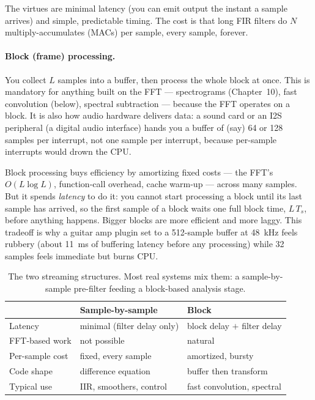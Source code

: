 The virtues are minimal latency (you can emit output the instant a sample
arrives) and simple, predictable timing. The cost is that long FIR filters do
$N$ multiply-accumulates (MACs) per sample, every sample, forever.

\paragraph{Block (frame) processing.} You collect $L$ samples into a buffer,
then process the whole block at once. This is mandatory for anything built on
the FFT --- spectrograms (Chapter~10), fast convolution (below), spectral
subtraction --- because the FFT operates on a block. It is also how audio
hardware delivers data: a sound card or an I2S peripheral (a digital audio interface) hands you a
buffer of (say) 64 or 128 samples per interrupt, not one sample per interrupt,
because per-sample interrupts would drown the CPU.

\begin{happeningbox}
Block processing buys efficiency by amortizing fixed costs --- the FFT's
$O(L\log L)$, function-call overhead, cache warm-up --- across many samples. But
it spends \emph{latency} to do it: you cannot start processing a block until its
last sample has arrived, so the first sample of a block waits one full block
time, $L\,T_s$, before anything happens. Bigger blocks are more efficient and
more laggy. This tradeoff is why a guitar amp plugin set to a 512-sample
buffer at 48~kHz feels rubbery (about 11~ms of buffering latency before any
processing) while 32 samples feels immediate but burns CPU.
\end{happeningbox}

\begin{table}[H]
\centering
\begin{tabular}{@{}lll@{}}
\toprule
 & \textbf{Sample-by-sample} & \textbf{Block} \\
\midrule
Latency        & minimal (filter delay only) & block delay $+$ filter delay \\
FFT-based work & not possible                & natural \\
Per-sample cost& fixed, every sample         & amortized, bursty \\
Code shape     & difference equation         & buffer then transform \\
Typical use    & IIR, smoothers, control     & fast convolution, spectral \\
\bottomrule
\end{tabular}
\caption{The two streaming structures. Most real systems mix them: a
sample-by-sample pre-filter feeding a block-based analysis stage.}
\label{ch17:tab-sampleblock}
\end{table}

